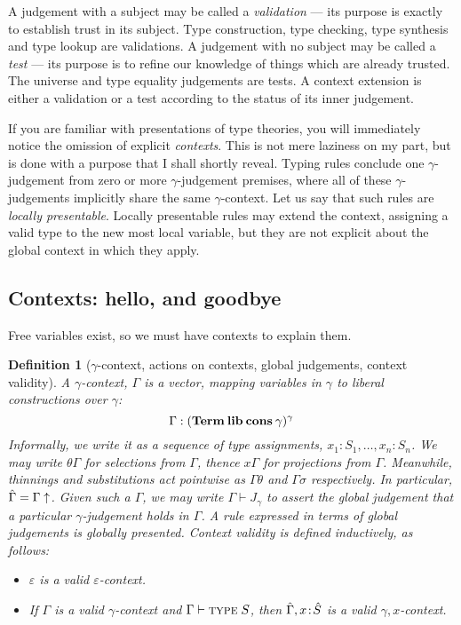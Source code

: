 \documentclass{jfp1}
\newtheorem{definition}[theorem]{Definition}
\newcommand{\emp}{\varepsilon}
\begin{document}
A judgement with a subject may be called a \emph{validation} --- its
purpose is exactly to establish trust in its subject. Type construction, type checking, type synthesis and type lookup are validations. A judgement with no subject may be called a
\emph{test} --- its purpose is to refine our knowledge of things which are already trusted.
The universe and type equality judgements are tests. A context extension is either a validation
or a test according to the status of its inner judgement.

If you are familiar with presentations of type theories, you will immediately notice the
omission of explicit \emph{contexts}. This is not mere laziness on my part, but is done
with a purpose that I shall shortly reveal. Typing rules conclude one $\gamma$-judgement
from zero or more $\gamma$-judgement premises, where all of these $\gamma$-judgements
implicitly share the same $\gamma$-context. Let us say that such rules are \emph{locally presentable}.
Locally presentable rules may extend the context, assigning a valid type to the new most local
variable, but they are not explicit about the global context in which they apply.


\subsection{Contexts: hello, and goodbye}

Free variables exist, so we must have contexts to explain them.

\begin{definition}[$\gamma$-context, actions on contexts, global
  judgements, context validity]
  A $\gamma$-context, $\Gamma$ is a vector, mapping variables in $\gamma$ to
  liberal constructions over $\gamma$:
  \[
    \Gamma : (\mathbf{Term}\:\textbf{lib}\:\textbf{cons}\:\gamma)^\gamma
    \]
  Informally, we write it as a sequence of type assignments,
  $x_1:S_1,\ldots,x_n:S_n$. We may write $\theta\Gamma$ for selections
  from $\Gamma$, thence $x\Gamma$ for projections from
  $\Gamma$. Meanwhile, thinnings and substitutions act pointwise as
  $\Gamma\theta$ and $\Gamma\sigma$ respectively. In particular, $\hat\Gamma = \Gamma\uparrow$.
  Given such a $\Gamma$, we may write $\Gamma\vdash J_\gamma$ to assert
  the \emph{global judgement} that a particular $\gamma$-judgement holds in $\Gamma$.
  A rule expressed in terms of global judgements is \emph{globally
    presented}.
  Context \emph{validity} is defined inductively, as follows:
  \begin{itemize}
  \item $\emp$ is a valid $\emp$-context.
  \item If $\Gamma$ is a valid $\gamma$-context and $\Gamma\vdash\textsc{type}\;S$, then $\hat\Gamma,x\!:\!\hat S$ is a valid $\gamma,x$-context.
  \end{itemize}
\end{definition}
\end{document}
